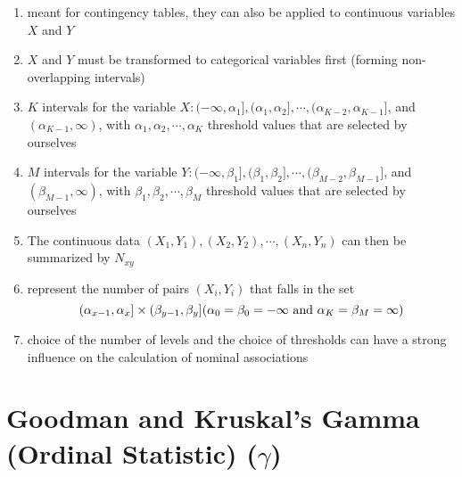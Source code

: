 \begin{enumerate}
    \item meant for contingency tables, they can also be applied to continuous variables $X$ and $Y$

    \item $X$ and $Y$ must be transformed to categorical variables first (forming non-overlapping intervals)

    \item $K$ intervals for the variable $X: (-\infty, \alpha_1], (\alpha_1, \alpha_2],\cdots,(\alpha_{K-2}, \alpha_{K-1}]$, and $(\alpha_{K-1},\infty)$, with $\alpha_1, \alpha_2,\cdots, \alpha_K$ threshold values that are selected by ourselves

    \item $M$ intervals for the variable $Y: (-\infty, \beta_1], (\beta_1, \beta_2],\cdots,(\beta_{M-2}, \beta_{M-1}]$, and $(\beta_{M-1},\infty)$, with $\beta_1, \beta_2,\cdots, \beta_M$ threshold values that are selected by ourselves

    \item The continuous data $(X_1, Y_1), (X_2, Y_2), \cdots , (X_n, Y_n)$ can then be summarized by $N_{xy}$ 

    \item represent the number of pairs $(X_i, Y_i)$ that falls in the set 
    \[
        (\alpha_{x-1}, \alpha_x] \times (\beta_{y-1}, \beta_y] 
        \hfill
        (\alpha_0 = \beta_0 = -\infty \text{ and } \alpha_K = \beta_M = \infty)
    \]

    \item choice of the number of levels and the choice of thresholds can have a strong influence on the calculation of nominal associations
\end{enumerate}


\section{Goodman and Kruskal’s Gamma (Ordinal Statistic) ($\gamma$) \cite{ism-1}} \label{Multivariate Distributions: Goodman and Kruskal’s Gamma (Ordinal Statistic)}


